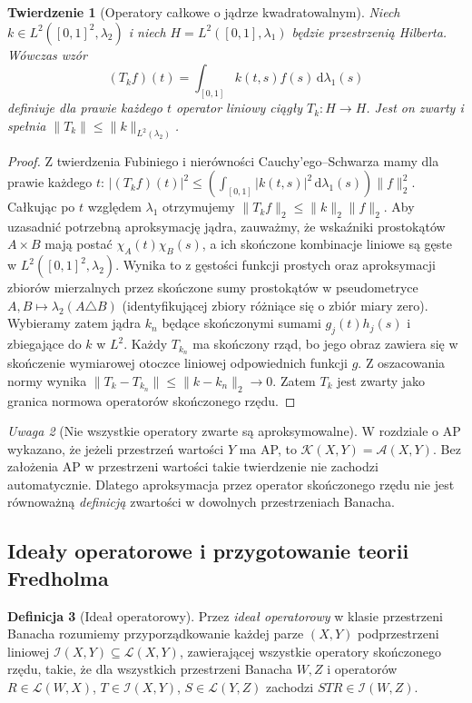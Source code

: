 \documentclass[11pt,a4paper]{article}
\numberwithin{equation}{section}
\theoremstyle{plain}
\newtheorem{twierdzenie}{Twierdzenie}[section]
\theoremstyle{definition}
\newtheorem{definicja}[twierdzenie]{Definicja}
\theoremstyle{remark}
\newtheorem{uwaga}[twierdzenie]{Uwaga}
\begin{document}
\begin{twierdzenie}[Operatory całkowe o jądrze kwadratowalnym]
\label{thm:hilbert-schmidt29}
Niech $k\in L^2([0,1]^2,\lambda_2)$ i niech
$H=L^2([0,1],\lambda_1)$ będzie przestrzenią Hilberta.
Wówczas wzór
\[
(T_kf)(t)=\int_{[0,1]}k(t,s)f(s)\,\mathrm d\lambda_1(s)
\]
definiuje dla prawie każdego $t$ operator liniowy ciągły
$T_k:H\to H$. Jest on zwarty i spełnia
$\|T_k\|\le\|k\|_{L^2(\lambda_2)}$.
\end{twierdzenie}
\begin{proof}
Z twierdzenia Fubiniego i nierówności Cauchy'ego--Schwarza
mamy dla prawie każdego $t$:
$|(T_kf)(t)|^2\le
(\int_{[0,1]}|k(t,s)|^2\,\mathrm d\lambda_1(s))\|f\|_2^2$.
Całkując po $t$ względem $\lambda_1$ otrzymujemy
$\|T_kf\|_2\le\|k\|_2\|f\|_2$.
Aby uzasadnić potrzebną aproksymację jądra, zauważmy, że
wskaźniki prostokątów $A\times B$ mają postać
$\chi_A(t)\chi_B(s)$, a ich skończone kombinacje
liniowe są gęste w $L^2([0,1]^2,\lambda_2)$.
Wynika to z gęstości funkcji prostych oraz aproksymacji
zbiorów mierzalnych przez skończone sumy prostokątów
w pseudometryce $A,B\mapsto\lambda_2(A\triangle B)$
(identyfikującej zbiory różniące się o zbiór miary zero).
Wybieramy zatem jądra $k_n$ będące skończonymi sumami
$g_j(t)h_j(s)$ i zbiegające do $k$ w $L^2$.
Każdy $T_{k_n}$ ma skończony rząd, bo jego obraz zawiera się
w skończenie wymiarowej otoczce liniowej odpowiednich
funkcji $g$. Z oszacowania normy wynika
$\|T_k-T_{k_n}\|\le\|k-k_n\|_2\to0$.
Zatem $T_k$ jest zwarty jako granica normowa operatorów
skończonego rzędu.
\end{proof}

\begin{uwaga}[Nie wszystkie operatory zwarte są aproksymowalne]
\label{rem:nonapproximable29}
W rozdziale o AP wykazano, że jeżeli przestrzeń wartości
$Y$ ma AP, to $\mathcal K(X,Y)=\mathcal A(X,Y)$.
Bez założenia AP w przestrzeni wartości takie twierdzenie
nie zachodzi automatycznie. Dlatego aproksymacja przez
operator skończonego rzędu nie jest równoważną
\emph{definicją} zwartości w dowolnych przestrzeniach Banacha.
\end{uwaga}

\subsection{Ideały operatorowe i przygotowanie teorii Fredholma}

\begin{definicja}[Ideał operatorowy]
\label{def:operator-ideal29}
Przez \emph{ideał operatorowy} w klasie przestrzeni Banacha
rozumiemy przyporządkowanie każdej parze $(X,Y)$
podprzestrzeni liniowej $\mathcal I(X,Y)\subseteq\mathcal L(X,Y)$,
zawierającej wszystkie operatory skończonego rzędu,
takie, że dla wszystkich przestrzeni Banacha $W,Z$
i operatorów $R\in\mathcal L(W,X)$, $T\in\mathcal I(X,Y)$,
$S\in\mathcal L(Y,Z)$ zachodzi
$STR\in\mathcal I(W,Z)$.
\end{definicja}
\end{document}
